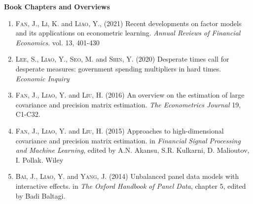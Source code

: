 \documentclass[11pt]{article}
\begin{document}

 




 





 
 


 \textbf{Book Chapters and Overviews}

  \begin{enumerate}
  \item    \textsc{Fan, J.}, \textsc{Li, K.} and \textsc{Liao, Y.},   (2021)  Recent developments on factor models and its applications on econometric learning.  \textit{ Annual Reviews of Financial Economics.} vol. 13, 401-430






\item    \textsc{Lee, S., \textsc{Liao, Y.}, Seo, M.} and \textsc{Shin, Y.} (2020)  Desperate times call for desperate measures: government spending multipliers in hard times.   \textit{ Economic Inquiry} 

    \item   \textsc{Fan, J.},  \textsc{\textsc{Liao, Y.}} and \textsc{Liu, H.}  (2016) An overview on the estimation of large covariance and precision matrix estimation.    \textit{  { The Econometrics Journal}}  {19}, C1-C32.

  \item   \textsc{Fan, J.},  \textsc{\textsc{Liao, Y.}} and \textsc{Liu, H.}  (2015) Approaches to high-dimensional covariance and precision matrix estimation.   in
    {\it Financial Signal Processing and Machine Learning}, edited by A.N. Akansu, S.R. Kulkarni, D. Malioutov, I. Pollak.  Wiley

     \item   \textsc{Bai, J.},  \textsc{\textsc{Liao, Y.}} and \textsc{Yang, J.}  (2014) Unbalanced panel data models with interactive effects.  in {\it The Oxford Handbook of Panel Data}, chapter 5, edited by Badi Baltagi.



\end{enumerate}
\end{document}
